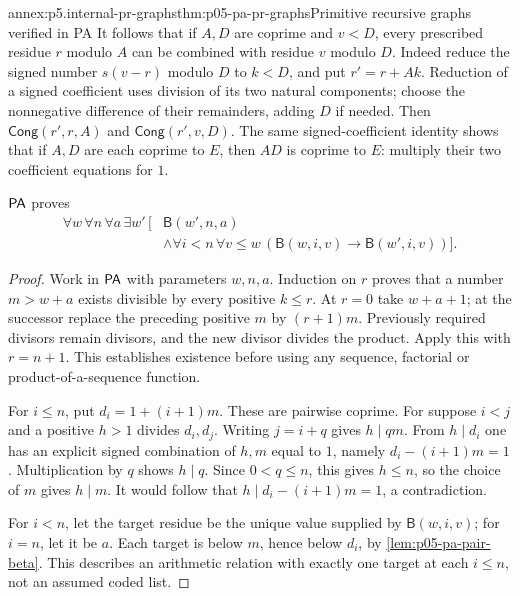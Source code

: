 \begin{annexitem}{annex:p5.internal-pr-graphs}{thm:p05-pa-pr-graphs}{Primitive recursive graphs verified in PA}
It follows that if \(A,D\) are coprime and \(v<D\), every prescribed
residue \(r\) modulo \(A\) can be combined with residue \(v\) modulo
\(D\).  Indeed reduce the signed number \(s(v-r)\) modulo \(D\) to
\(k<D\), and put \(r'=r+Ak\).  Reduction of a signed coefficient uses
division of its two natural components; choose the nonnegative difference
of their remainders, adding \(D\) if needed.  Then
\(\mathsf{Cong}(r',r,A)\) and \(\mathsf{Cong}(r',v,D)\).
The same signed-coefficient identity shows that if \(A,D\) are each
coprime to \(E\), then \(AD\) is coprime to \(E\): multiply
their two coefficient equations for \(1\).

\begin{annexlemma}
\label{lem:p05-pa-beta-extension}
\(\mathsf{PA}\) proves
\[
\begin{split}
 \forall w\,\forall n\,\forall a\,\exists w'\,\bigl[
 &\mathsf B(w',n,a)\\
 &\land\forall i<n\,\forall v\leq w\,
          (\mathsf B(w,i,v)\to\mathsf B(w',i,v))\bigr].
\end{split}
\]
\end{annexlemma}
\begin{proof}
Work in \(\mathsf{PA}\) with parameters \(w,n,a\).  Induction on \(r\)
proves that a number \(m>w+a\) exists divisible by every positive
\(k\leq r\).  At \(r=0\) take \(w+a+1\); at the successor replace
the preceding positive \(m\) by \((r+1)m\).  Previously required
divisors remain divisors, and the new divisor divides the product.  Apply
this with \(r=n+1\).  This establishes existence before using any
sequence, factorial or product-of-a-sequence function.

For \(i\leq n\), put \(d_i=1+(i+1)m\).  These are pairwise coprime.
For suppose \(i<j\) and a positive \(h>1\) divides \(d_i,d_j\).
Writing \(j=i+q\) gives \(h\mid qm\).  From \(h\mid d_i\)
one has an explicit signed combination of \(h,m\) equal to \(1\),
namely \(d_i-(i+1)m=1\).  Multiplication by \(q\) shows
\(h\mid q\).  Since \(0<q\leq n\), this gives \(h\leq n\),
so the choice of \(m\) gives \(h\mid m\).  It would follow that
\(h\mid d_i-(i+1)m=1\), a contradiction.

For \(i<n\), let the target residue be the unique value supplied by
\(\mathsf B(w,i,v)\); for \(i=n\), let it be \(a\).
Each target is below \(m\), hence below \(d_i\), by
\cref{lem:p05-pa-pair-beta}.  This describes an arithmetic relation with
exactly one target at each \(i\leq n\), not an assumed coded list.


\end{proof}
\end{annexitem}
